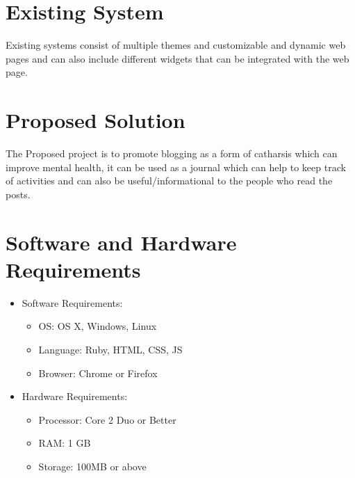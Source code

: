 \documentclass[a4paper,14pt]{extarticle}
\begin{document}
\section{Existing System}
Existing systems consist of multiple themes and customizable and dynamic web pages and can also include different widgets that can be integrated with the web page.

\section{Proposed Solution}
The Proposed project is to promote blogging as a form of catharsis which can improve mental health, it can be used as a journal which can help to keep track of activities and can also be useful/informational to the people who read the posts.

\section{Software and Hardware Requirements}
\begin{itemize}
    \item Software Requirements:
    \begin{itemize}
        \item OS: OS X, Windows, Linux
        \item Language: Ruby, HTML, CSS, JS
        \item Browser: Chrome or Firefox
    \end{itemize}
    \item Hardware Requirements:
    \begin{itemize}
        \item Processor: Core 2 Duo or Better
        \item RAM: 1 GB
        \item Storage: 100MB or above
    \end{itemize}
\end{itemize}

\pagebreak
\end{document}

